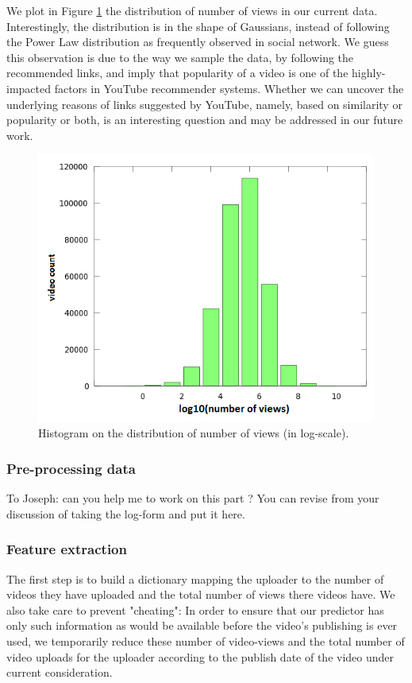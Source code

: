 		We plot in Figure \ref{fig:logNoOfViews} the distribution of number of views in our current data. Interestingly, the distribution is in the shape of Gaussians, instead of following the Power Law distribution as frequently observed in social network. We guess this observation is due to the way we sample the data, by following the recommended links, and imply that popularity of a video is one of the highly-impacted factors in YouTube recommender systems. Whether we can uncover the underlying reasons of links suggested by YouTube, namely, based on similarity or popularity or both, is an interesting question and may be addressed in our future work.
		
		\begin{figure}[!h]
			\begin{center}
				\includegraphics[width=.75\textwidth,clip]{DistributionOfViews.png}				
			\end{center}
			\caption{Histogram on the distribution of number of views (in log-scale).}
			\label{fig:logNoOfViews}
		\end{figure}
				
		\subsubsection{Pre-processing data}
		\label{sec:preprocessing}
		To Joseph: can you help me to work on this part ? You can revise from your discussion of taking the log-form and put it here.
		
		\subsubsection{Feature extraction}
		The first step is to build a dictionary mapping the uploader to the number of videos they have uploaded and the total number of views there videos have. We also take care to prevent "cheating":  In order to ensure that our predictor has only such information as would be available before the video's publishing is ever used, we temporarily reduce these number of video-views and the total number of video uploads for the uploader according to the publish date of the video under current consideration.

